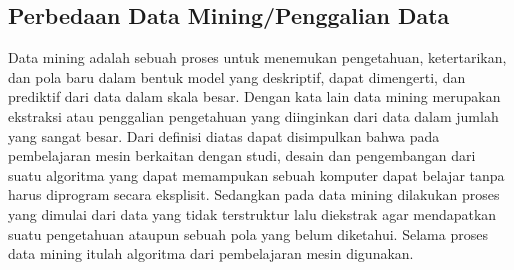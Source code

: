 \subsection{Perbedaan Data Mining/Penggalian Data}
 Data mining adalah sebuah proses untuk menemukan pengetahuan, ketertarikan, dan pola baru dalam bentuk model yang deskriptif, dapat dimengerti, dan prediktif dari data dalam skala besar. Dengan kata lain data mining merupakan ekstraksi atau penggalian pengetahuan yang diinginkan dari data dalam jumlah yang sangat besar.
Dari definisi diatas dapat disimpulkan bahwa pada pembelajaran mesin berkaitan dengan studi, desain dan pengembangan dari suatu algoritma yang dapat memampukan sebuah komputer dapat belajar tanpa harus diprogram secara eksplisit. Sedangkan pada data mining dilakukan proses yang dimulai dari data yang tidak terstruktur lalu diekstrak agar mendapatkan suatu pengetahuan ataupun sebuah pola yang belum diketahui. Selama proses data mining itulah algoritma dari pembelajaran mesin digunakan.


